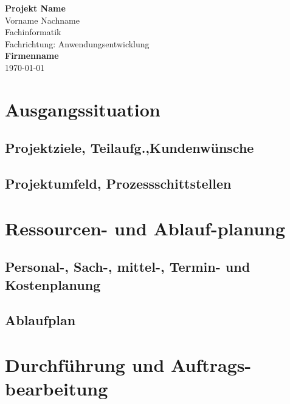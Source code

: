 \documentclass[pdftex,10pt,a4paper,appendixprefix,liststotoc]{scrreprt}
\begin{document}
\begin{titlepage}
 \begin{center}
	\huge
	\textbf{Projekt Name} %
	\bigskip\\
	\large
	Vorname Nachname \\   %
	Fachinformatik\\
	Fachrichtung: Anwendungsentwicklung %
	\bigskip\\
   \textbf{Firmenname} %
	\bigskip\\
	\today
\end{center}
\end{titlepage}
\newpage
{}
\tableofcontents
\newpage
{}


\chapter{Ausgangssituation}

\section{Projektziele, Teilaufg.,Kundenw\"unsche }

\section{Projektumfeld, Prozessschittstellen}

\chapter{Ressourcen- und Ablauf-planung}

\section{Personal-, Sach-, mittel-, Termin- und Kostenplanung}

\section{Ablaufplan}

\chapter{Durchführung und Auftrags-bearbeitung}
\end{document}
